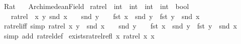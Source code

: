 %
\begin{isabellebody}%
%
%
\isadelimdocument
%
\endisadelimdocument
%
\isatagdocument
%
\isamarkuptrue%
%
\endisatagdocument
{\isafolddocument}%
%
\isadelimdocument
%
\endisadelimdocument
%
\isadelimtheory
%
\endisadelimtheory
%
\isatagtheory
{}\isamarkupfalse%
\ Rat\isanewline
\ \ \ Archimedean{\isacharunderscore}{\kern0pt}Field\isanewline
{}%
\endisatagtheory
{\isafoldtheory}%
%
\isadelimtheory
%
\endisadelimtheory
%
\isadelimdocument
%
\endisadelimdocument
%
\isatagdocument
%
\isamarkuptrue%
%
\isamarkuptrue%
%
\endisatagdocument
{\isafolddocument}%
%
\isadelimdocument
%
\endisadelimdocument
{}\isamarkupfalse%
\ ratrel\ {\isacharcolon}{\kern0pt}{\isacharcolon}{\kern0pt}\ {\isachardoublequoteopen}{\isacharparenleft}{\kern0pt}int\ {\isasymtimes}\ int{\isacharparenright}{\kern0pt}\ {\isasymRightarrow}\ {\isacharparenleft}{\kern0pt}int\ {\isasymtimes}\ int{\isacharparenright}{\kern0pt}\ {\isasymRightarrow}\ bool{\isachardoublequoteclose}\isanewline
\ \ \ {\isachardoublequoteopen}ratrel\ {\isacharequal}{\kern0pt}\ {\isacharparenleft}{\kern0pt}{\isasymlambda}x\ y{\isachardot}{\kern0pt}\ snd\ x\ {\isasymnoteq}\ {}\ {\isasymand}\ snd\ y\ {\isasymnoteq}\ {}\ {\isasymand}\ fst\ x\ {\isacharasterisk}{\kern0pt}\ snd\ y\ {\isacharequal}{\kern0pt}\ fst\ y\ {\isacharasterisk}{\kern0pt}\ snd\ x{\isacharparenright}{\kern0pt}{\isachardoublequoteclose}\isanewline
\isanewline
{}\isamarkupfalse%
\ ratrel{\isacharunderscore}{\kern0pt}iff\ {\isacharbrackleft}{\kern0pt}simp{\isacharbrackright}{\kern0pt}{\isacharcolon}{\kern0pt}\ {\isachardoublequoteopen}ratrel\ x\ y\ {\isasymlongleftrightarrow}\ snd\ x\ {\isasymnoteq}\ {}\ {\isasymand}\ snd\ y\ {\isasymnoteq}\ {}\ {\isasymand}\ fst\ x\ {\isacharasterisk}{\kern0pt}\ snd\ y\ {\isacharequal}{\kern0pt}\ fst\ y\ {\isacharasterisk}{\kern0pt}\ snd\ x{\isachardoublequoteclose}\isanewline
%
\isadelimproof
\ \ %
\endisadelimproof
%
\isatagproof
{}\isamarkupfalse%
\ {\isacharparenleft}{\kern0pt}simp\ add{\isacharcolon}{\kern0pt}\ ratrel{\isacharunderscore}{\kern0pt}def{\isacharparenright}{\kern0pt}%
\endisatagproof
{\isafoldproof}%
%
\isadelimproof
\isanewline
%
\endisadelimproof
\isanewline
{}\isamarkupfalse%
\ exists{\isacharunderscore}{\kern0pt}ratrel{\isacharunderscore}{\kern0pt}refl{\isacharcolon}{\kern0pt}\ {\isachardoublequoteopen}{\isasymexists}x{\isachardot}{\kern0pt}\ ratrel\ x\ x{\isachardoublequoteclose}\isanewline

\end{isabellebody}
